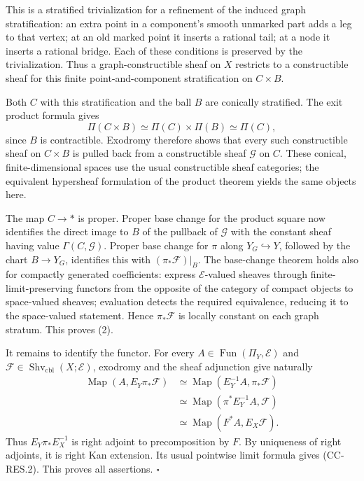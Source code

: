 This is a stratified trivialization for a refinement of the induced
graph stratification: an extra point in a component's smooth unmarked
part adds a leg to that vertex; at an old marked point it inserts a
rational tail; at a node it inserts a rational bridge. Each of these
conditions is preserved by the trivialization. Thus a
graph-constructible sheaf on \(X\) restricts to a constructible sheaf
for this finite point-and-component stratification on \(C\times B\).

Both \(C\) with this stratification and the ball \(B\) are conically
stratified. The exit product formula gives \[
\Pi(C\times B)\simeq\Pi(C)\times\Pi(B)\simeq\Pi(C),
\] since \(B\) is contractible. Exodromy therefore shows that every such
constructible sheaf on \(C\times B\) is pulled back from a constructible
sheaf \(\mathcal G\) on \(C\). These conical, finite-dimensional spaces
use the usual constructible sheaf categories; the equivalent hypersheaf
formulation of the product theorem yields the same objects here.

The map \(C\to *\) is proper. Proper base change for the product square
now identifies the direct image to \(B\) of the pullback of
\(\mathcal G\) with the constant sheaf having value
\(\Gamma(C,\mathcal G)\). Proper base change for \(\pi\) along
\(Y_G\hookrightarrow Y\), followed by the chart \(B\to Y_G\), identifies
this with \((\pi_*\mathcal F)|_B\). The base-change theorem holds also
for compactly generated coefficients: express \(\mathcal E\)-valued
sheaves through finite-limit-preserving functors from the opposite of the category of compact objects to
space-valued sheaves; evaluation detects the required equivalence,
reducing it to the space-valued statement. Hence \(\pi_*\mathcal F\) is
locally constant on each graph stratum. This proves (2).

It remains to identify the functor. For every
\(A\in\operatorname{Fun}(\Pi_Y,\mathcal E)\) and
\(\mathcal F\in\operatorname{Shv}_{\mathrm{cbl}}(X;\mathcal E)\),
exodromy and the sheaf adjunction give naturally \[
\begin{aligned}
\operatorname{Map}(A,E_Y\pi_*\mathcal F)
&\simeq\operatorname{Map}(E_Y^{-1}A,\pi_*\mathcal F)\\
&\simeq\operatorname{Map}(\pi^*E_Y^{-1}A,\mathcal F)\\
&\simeq\operatorname{Map}(F^*A,E_X\mathcal F).
\end{aligned}
\] Thus \(E_Y\pi_*E_X^{-1}\) is right adjoint to precomposition by
\(F\). By uniqueness of right adjoints, it is right Kan extension. Its
usual pointwise limit formula gives (CC-RES.2). This proves all
assertions. \(\square\)

